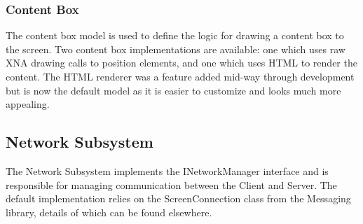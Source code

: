 \subsubsection{Content Box}
The content box model is used to define the logic for drawing a content box to
the screen. Two content box implementations are available: one which uses raw
XNA drawing calls to position elements, and one which uses HTML to render the
content. The HTML renderer was a feature added mid-way through development but
is now the default model as it is easier to customize and looks much more
appealing. 

\clearpage{}
\subsection{Network Subsystem}
The Network Subsystem implements the INetworkManager interface and is 
responsible for managing communication between the Client and Server. The 
default implementation relies on the ScreenConnection class from the Messaging
library, details of which can be found elsewhere. 


